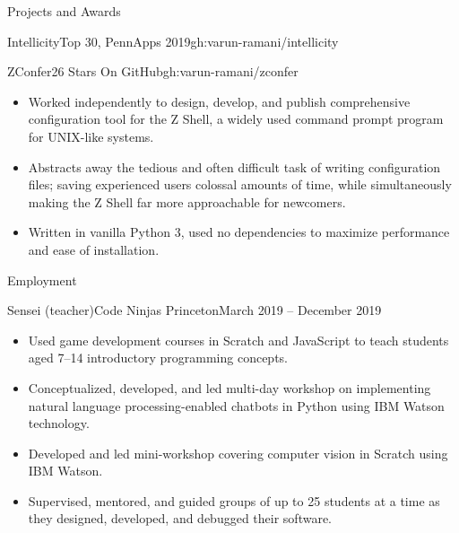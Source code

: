 \documentclass[]{mcdowellcv}
\begin{document}
\begin{cvsection}{Projects and Awards}
\begin{cvsubsection}{Intellicity}{Top 30, PennApps 2019}{gh:varun-ramani/intellicity}
\begin{itemize}
			\end{itemize}
		\end{cvsubsection}
		\begin{cvsubsection}{ZConfer}{26 Stars On GitHub}{gh:varun-ramani/zconfer}
			\begin{itemize}
				\item Worked independently to design, develop, and publish comprehensive configuration tool
				for the Z Shell, a widely used command prompt program for UNIX-like systems.
				\item Abstracts away the tedious and often difficult task of writing configuration files; 
				saving experienced users colossal amounts of time, while simultaneously making the Z Shell far
				more approachable for newcomers.
				\item Written in vanilla Python 3, used no dependencies to maximize performance and ease 
				of installation.
			\end{itemize}
		\end{cvsubsection}
	\end{cvsection}

	\begin{cvsection}{Employment}
		\begin{cvsubsection}{Sensei (teacher)}{Code Ninjas Princeton}{March 2019 -- December 2019}
			\begin{itemize}
				\item Used game development courses in Scratch and JavaScript to 
				teach students aged 7--14 introductory programming concepts.
				\item Conceptualized, developed, and led multi-day workshop on implementing natural language 
				processing-enabled chatbots in Python using IBM Watson technology.
				\item Developed and led mini-workshop covering computer vision in Scratch using IBM Watson.
				\item Supervised, mentored, and guided groups of up to 25 students at a time as they designed,
				developed, and debugged their software.
			\end{itemize}
		\end{cvsubsection}
	\end{cvsection}
\end{document}

